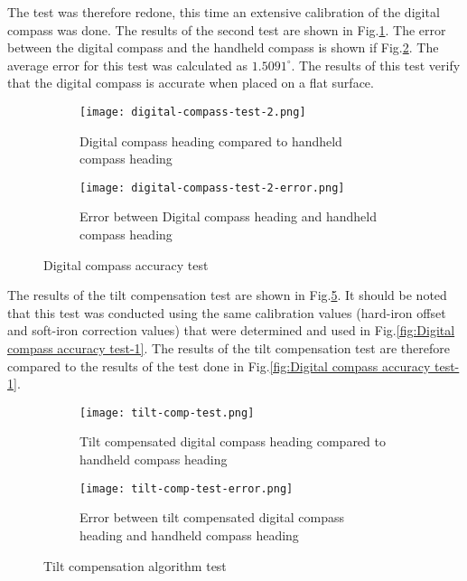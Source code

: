 The test was therefore redone, this time an extensive calibration of the digital compass was done. The results of the second test are shown in Fig.\ref{subfig:digital-compass-test-2}. The error 
between the digital compass and the handheld compass is shown if Fig.\ref{subfig:digital-compass-test-2-error}. The average error for this test was calculated as $1.5091^{\circ}$. The results of
this test verify that the digital compass is accurate when placed on a flat surface.

\begin{figure}[!h]
    \centering
    \begin{subfigure}[!h]{=0.9\linewidth}
        \centering
        \texttt{[image: digital-compass-test-2.png]}
        \caption{Digital compass heading compared to handheld compass heading}
        \label{subfig:digital-compass-test-2}
    \end{subfigure}

    \begin{subfigure}[!h]{=0.9\linewidth}
        \centering
        \texttt{[image: digital-compass-test-2-error.png]}
        \caption{Error between Digital compass heading and handheld compass heading}
        \label{subfig:digital-compass-test-2-error}
    \end{subfigure}
    \caption[Digital compass accuracy test-2]{Digital compass accuracy test}
    \label{fig:Digital compass accuracy test-2}
\end{figure}

The results of the tilt compensation test are shown in Fig.\ref{subfig:tilt-comp-error}. It should be noted that this test was conducted using the same calibration values (hard-iron offset and 
soft-iron correction values) that were determined and used in Fig.\ref{fig:Digital compass accuracy test-1}. The results of the tilt compensation test are therefore compared to the results of 
the test done in Fig.\ref{fig:Digital compass accuracy test-1}. 

\begin{figure}[!h]
    \centering
    \begin{subfigure}[!h]{=0.9\linewidth}
        \centering
        \texttt{[image: tilt-comp-test.png]}
        \caption{Tilt compensated digital compass heading compared to handheld compass heading}
        \label{subfig:tilt-comp-test}
    \end{subfigure}

    \begin{subfigure}[!h]{=0.9\linewidth}
        \centering
        \texttt{[image: tilt-comp-test-error.png]}
        \caption{Error between tilt compensated digital compass heading and handheld compass heading}
        \label{subfig:tilt-comp-error}
    \end{subfigure}
    \caption[Tilt compensation test]{Tilt compensation algorithm test}
    \label{fig:tilt-comp}
\end{figure}

